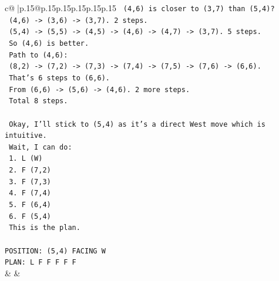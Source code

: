 \documentclass{article}
\begin{document}
{\begin{supertabular}{c@{$\;$}|p{.15\linewidth}@{}p{.15\linewidth}p{.15\linewidth}p{.15\linewidth}p{.15\linewidth}p{.15\linewidth}}
{{{\texttt{   (4,6) is closer to (3,7) than (5,4)?} \\
\texttt{   (4,6) {-}> (3,6) {-}> (3,7). 2 steps.} \\
\texttt{   (5,4) {-}> (5,5) {-}> (4,5) {-}> (4,6) {-}> (4,7) {-}> (3,7). 5 steps.} \\
\texttt{   So (4,6) is better.} \\
\texttt{   Path to (4,6):} \\
\texttt{   (8,2) {-}> (7,2) {-}> (7,3) {-}> (7,4) {-}> (7,5) {-}> (7,6) {-}> (6,6).} \\
\texttt{   That's 6 steps to (6,6).} \\
\texttt{   From (6,6) {-}> (5,6) {-}> (4,6). 2 more steps.} \\
\texttt{   Total 8 steps.} \\
\\ 
\texttt{   Okay, I'll stick to (5,4) as it's a direct West move which is intuitive.} \\
\texttt{   Wait, I can do:} \\
\texttt{   1. L (W)} \\
\texttt{   2. F (7,2)} \\
\texttt{   3. F (7,3)} \\
\texttt{   4. F (7,4)} \\
\texttt{   5. F (6,4)} \\
\texttt{   6. F (5,4)} \\
\texttt{   This is the plan.} \\
\\ 
\texttt{POSITION: (5,4) FACING W} \\
\texttt{PLAN: L F F F F F} \\
            }
        }
    }
    & & \\ \\


\end{supertabular}}
\end{document}
